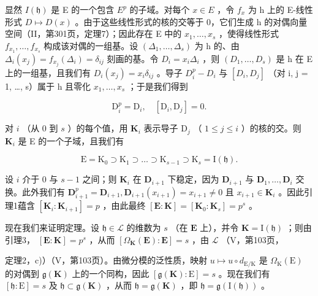 显然 \(I(\mathfrak{h})\) 是 E 的一个包含 \(E^{p}\) 的子域。对每个 \(x \in E\) ，令 \(f_{x}\) 为 h 上的 E-线性形式 \(D \mapsto D(x)\) 。由于这些线性形式的核的交等于 0，它们生成 h 的对偶向量空间（II，第301页，定理7）；因此存在 E 中的 \(x_{1}, \ldots, x_{s}\) ，使得线性形式 \(f_{x_{1}}, \ldots, f_{x_{s}}\) 构成该对偶的一组基。设 \((\Delta_{1}, \ldots, \Delta_{s})\) 为 h 的、由 \(\Delta_{i}(x_{j}) = f_{x_{j}}(\Delta_{i}) = \delta_{ij}\) 刻画的基。令 \(D_{i} = x_{i}\Delta_{i}\) ，则 \((D_{1}, \ldots, D_{s})\) 是 h 在 E 上的一组基，且我们有 \(D_{i}(x_{j}) = x_{i}\delta_{ij}\) 。导子 \(D_{i}^{p} - D_{i}\) 与 \([D_{i}, D_{j}]\) （对 i, j = 1, \ldots, s）属于 h 且零化 \(x_{1}, \ldots, x_{s}\) ；于是我们得到

\[
\mathrm{D} _ {i} ^ {p} = \mathrm{D} _ {i}, \quad [ \mathrm{D} _ {i}, \mathrm{D} _ {j} ] = 0.\tag{10}
\]

对 \(i\) （从 0 到 \(s\) ）的每个值，用 \(\mathbf{K}_i\) 表示导子 \(\mathrm{D}_j\) （ \(1 \leqslant j \leqslant i\) ）的核的交。则 \(\mathbf{K}_i\) 是 E 的一个子域，且我们有

\[
\mathrm{E} = {\mathrm{K}} _ {0} \supset \mathrm{K} _ {1} \supset \dots \supset \mathrm{K} _ {s - 1} \supset \mathrm{K} _ {s} = \mathrm{I} (\mathfrak {h}).
\]

设 \(i\) 介于 0 与 \(s-1\) 之间；则 \(\mathbf{K}_{i}\) 在 \(\mathbf{D}_{i+1}\) 下稳定，因为 \(\mathbf{D}_{i+1}\) 与 \(\mathbf{D}_{1}, \ldots, \mathbf{D}_{i}\) 交换。此外我们有 \(\mathbf{D}_{i+1}^{p} = \mathbf{D}_{i+1}, \mathbf{D}_{i+1}(x_{i+1}) = x_{i+1} \neq 0\) 且 \(x_{i+1} \in \mathbf{K}_{i}\) 。因此引理1蕴含 \([\mathbf{K}_{i}: \mathbf{K}_{i+1}] = p\) ，由此最终 \([\mathbf{E}: \mathbf{K}] = [\mathbf{K}_{0}: \mathbf{K}_{s}] = p^{s}\) 。

现在我们来证明定理。设 \(\mathfrak{h} \in \mathcal{L}\) 的维数为 \(s\) （在 \(\mathbf{E}\) 上），并令 \(\mathbf{K} = \mathrm{I}(\mathfrak{h})\) ；则由引理3， \([\mathbf{E}:\mathbf{K}] = p^s\) ，从而 \([\Omega_{\mathbf{K}}(\mathbf{E}):\mathbf{E}] = s\) ，由 \(\mathcal{L}\) （V，第103页，

定理2，c)）（V，第103页）。由微分模的泛性质，映射 \(u \mapsto u \circ d_{\mathrm{E} / \mathrm{K}}\) 是 \(\Omega_{\mathrm{K}}(\mathrm{E})\) 的对偶到 \(\mathfrak{g}(\mathbf{K})\) 上的一个同构，因此 \([\mathfrak{g}(\mathbf{K}) : \mathrm{E}] = s\) 。现在我们有 \([\mathfrak{h} : \mathrm{E}] = s\) 及 \(\mathfrak{h} \subset \mathfrak{g}(\mathbf{K})\) ，从而 \(\mathfrak{h} = \mathfrak{g}(\mathbf{K})\) ，即 \(\mathfrak{h} = \mathfrak{g}(\mathrm{I}(\mathfrak{h}))\) 。

